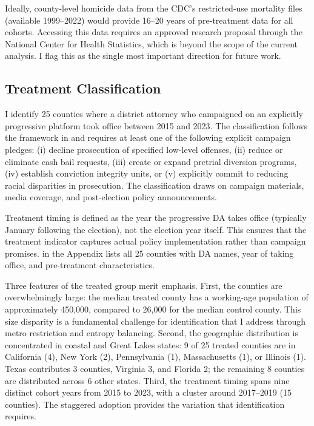 \documentclass[12pt]{article}
\begin{document}
Ideally, county-level homicide data from the CDC's restricted-use mortality files (available 1999--2022) would provide 16--20 years of pre-treatment data for all cohorts. Accessing this data requires an approved research proposal through the National Center for Health Statistics, which is beyond the scope of the current analysis. I flag this as the single most important direction for future work.

\subsection{Treatment Classification}

I identify 25 counties where a district attorney who campaigned on an explicitly progressive platform took office between 2015 and 2023. The classification follows the framework in \citet{baumer2022da} and requires at least one of the following explicit campaign pledges: (i) decline prosecution of specified low-level offenses, (ii) reduce or eliminate cash bail requests, (iii) create or expand pretrial diversion programs, (iv) establish conviction integrity units, or (v) explicitly commit to reducing racial disparities in prosecution. The classification draws on campaign materials, media coverage, and post-election policy announcements.

Treatment timing is defined as the year the progressive DA takes office (typically January following the election), not the election year itself. This ensures that the treatment indicator captures actual policy implementation rather than campaign promises.  in the Appendix lists all 25 counties with DA names, year of taking office, and pre-treatment characteristics.

Three features of the treated group merit emphasis. First, the counties are overwhelmingly large: the median treated county has a working-age population of approximately 450,000, compared to 26,000 for the median control county. This size disparity is a fundamental challenge for identification that I address through metro restriction and entropy balancing. Second, the geographic distribution is concentrated in coastal and Great Lakes states: 9 of 25 treated counties are in California (4), New York (2), Pennsylvania (1), Massachusetts (1), or Illinois (1). Texas contributes 3 counties, Virginia 3, and Florida 2; the remaining 8 counties are distributed across 6 other states. Third, the treatment timing spans nine distinct cohort years from 2015 to 2023, with a cluster around 2017--2019 (15 counties). The staggered adoption provides the variation that identification requires.
\end{document}
